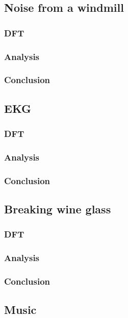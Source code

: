 \subsection{Noise from a windmill}
\subsubsection{DFT}

\subsubsection{Analysis}

\subsubsection{Conclusion}

\subsection{EKG}
\subsubsection{DFT}

\subsubsection{Analysis}

\subsubsection{Conclusion}

\subsection{Breaking wine glass}
\subsubsection{DFT}

\subsubsection{Analysis}

\subsubsection{Conclusion}

\subsection{Music}
